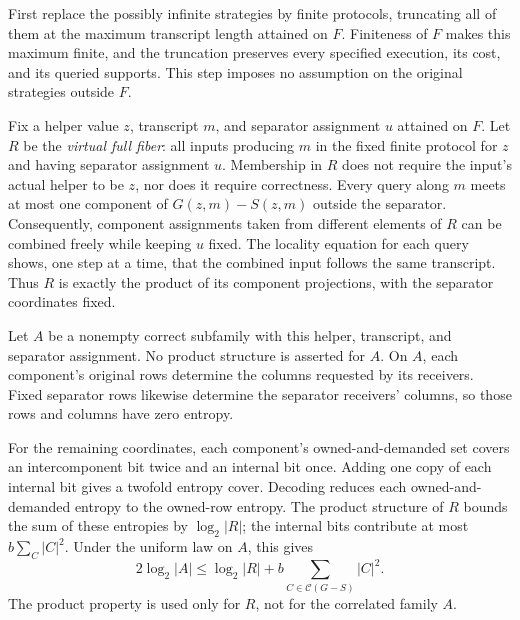 \begin{proofoutline}
First replace the possibly infinite strategies by finite protocols, truncating
all of them at the maximum transcript length attained on $F$.  Finiteness of
$F$ makes this maximum finite, and the truncation preserves every specified
execution, its cost, and its queried supports.  This step imposes no assumption
on the original strategies outside $F$.

Fix a helper value $z$, transcript $m$, and separator assignment $u$ attained
on $F$.  Let $R$ be the \emph{virtual full fiber}: all
inputs producing $m$ in the fixed finite protocol for $z$ and having separator
assignment $u$.  Membership in $R$ does not require the input's actual helper
to be $z$, nor does it require correctness.  Every query along $m$ meets at
most one component of $G(z,m)-S(z,m)$ outside the separator.  Consequently,
component assignments taken from different elements of $R$ can be combined
freely while keeping $u$ fixed.  The locality equation for each query shows,
one step at a time, that the combined input follows the same transcript.
Thus $R$ is exactly the product of its component projections, with the
separator coordinates fixed.

Let $A$ be a nonempty correct subfamily with this helper, transcript, and
separator assignment.  No product structure is asserted for $A$.  On $A$,
each component's original rows determine the columns requested by its
receivers.  Fixed separator rows likewise determine the separator receivers'
columns, so those rows and columns have zero entropy.

For the remaining coordinates, each component's owned-and-demanded set
covers an intercomponent bit twice and an internal bit once.  Adding one
copy of each internal bit gives a twofold entropy cover.  Decoding reduces
each owned-and-demanded entropy to the owned-row entropy.  The product
structure of $R$ bounds the sum of these entropies by $\log_2|R|$; the
internal bits contribute at most $b\sum_C|C|^2$.  Under the uniform law on
$A$, this gives
\begin{equation}\label{eq:local-leaf-count}
  2\log_2|A|\le \log_2|R|+
        b\sum_{C\in\mathcal C(G-S)}|C|^2.
\end{equation}
The product property is used only for $R$, not for the correlated family $A$.


\end{proofoutline}
